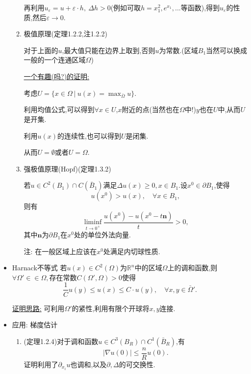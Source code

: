 \documentclass[12pt, a4paper]{ctexbook}
\begin{document}
\begin{itemize}
\begin{enumerate}
            再利用$u_\varepsilon=u+\varepsilon\cdot h,\ \Delta h>0$(例如可取$h=x_1^2, e^{x_1},...$等函数),得到$u_\varepsilon$的性质,然后$\varepsilon\rightarrow0$.
            
            \item 极值原理(定理1.2.2,注1.2.2)
            
            对于上面的$u$,最大值只能在边界上取到,否则$u$为常数.(区域$B_1$当然可以换成一般的一个连通区域$\Omega$)
            
            \uline{一个有趣(吗?)的证明:}
            
            考虑$U=\{x\in\Omega\ |\ u(x)=\mathop{\max}_{\bar{\Omega}}u\}$.
            
            利用均值公式,可以得到$\forall x\in U$,$x$附近的点(当然也在$\Omega $中!)$y$也在$U$中,从而$U$是开集.
            
            利用$u(x)$的连续性,也可以得到$U$是闭集.
            
            从而$U=\emptyset$或者$U=\Omega$.
            
            \item 强极值原理(Hopf)(定理1.3.2)
            
            若$u\in C^2(B_1)\cap C(\bar{B}_1)$满足$\Delta u(x) \geq 0, x\in B_1$.设$x^0\in\partial B_1$,使得
            $$u(x^0)>u(x), \quad \forall x\in B_1,$$则有
            $$\mathop{\lim\inf}_{t\rightarrow 0^+}\frac{u(x^0) - u(x^0-t\bm n)}t > 0,$$
            其中$\bm n$为$\partial B_1$在$x^0$处的单位外法向量.
            
            注: 在一般区域上应该在$x^0$处满足内切球性质.
        \end{enumerate}
        \item Harnack不等式
        若$u(x)\in C^2(\Omega)$为$\mathbb{R}^n$中的区域$\Omega$上的调和函数,则$\forall \Omega' \in\in \Omega,$存在常数$C(\Omega', \Omega) > 0$使得
        $$\frac1{C}u(y) \leq u(x) \leq C\cdot u(y),\quad \forall x,y\in\bar{\Omega}'.$$
        
        \uline{证明思路:} 可利用$\Omega'$的紧性,利用有限个开球将$x,y$连接.
        
        \item 应用: 梯度估计
        \begin{enumerate}
            \item (定理1.2.4)对于调和函数$u\in C^3(B_R)\cap C^1(\bar{B}_R)$,有
            $$|\nabla u(0)| \leq \frac nR u(0).$$
            证明利用了$\partial_{x_i}u$也调和,以及$\partial, \Delta$的可交换性.
            

\end{enumerate}
\end{itemize}
\end{document}
